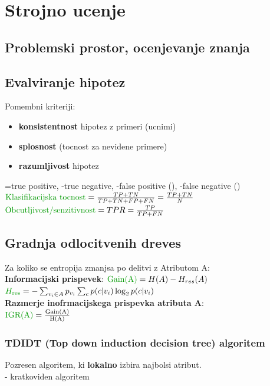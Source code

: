 \section{Strojno ucenje}


\subsection{Problemski prostor, ocenjevanje znanja}

\subsection{Evalviranje hipotez}
Pomembni kriteriji:
\begin{itemize}[leftmargin=*,labelindent=0pt,labelwidth=0pt,itemsep=0pt,parsep=0pt,topsep=0pt]
    \item \textbf{konsistentnost} hipotez z primeri (ucnimi)
    \item \textbf{splosnost} (tocnost za nevidene primere)
    \item \textbf{razumljivost} hipotez
\end{itemize}
=true positive, -true negative, -false positive (), -false negative () \\
$\text{\green{Klasifikacijska tocnost}}=\frac{TP+TN}{TP+TN+FP+FN}=\frac{TP+TN}{N}$\\
$\text{\green{Obcutljivost/senzitivnost}}=TPR=\frac{TP}{TP+FN}$

\subsection{Gradnja odlocitvenih dreves}
Za koliko se entropija zmanjsa po delitvi z Atributom A:\\
\textbf{Informacijski prispevek}: $\text{\green{Gain(A)}}=H(A)-H_{res}(A)$\\
$\green{H_{\text{res}}}=-\sum_{v_i\in A}p_{v_i}\sum_c p(c|v_i)\log_2p(c|v_i)$\\
\textbf{Razmerje inofrmacijskega prispevka atributa A}:\\ 
$\text{\green{IGR(A)}}=\frac{\text{Gain(A)}}{\text{H(A)}}$


\subsubsection{TDIDT (Top down induction decision tree) algoritem}
Pozresen algoritem, ki \textbf{lokalno} izbira najbolsi atribut.\\
- kratkoviden algoritem


